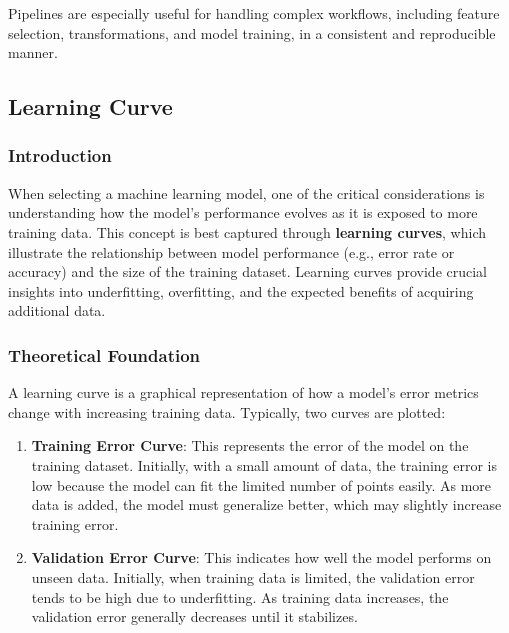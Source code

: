 \documentclass{article}
\begin{document}
Pipelines are especially useful for handling complex workflows,
including feature selection, transformations, and model training, in a
consistent and reproducible manner.

    \subsection{Learning Curve}\label{learning-curve}

    \subsubsection{Introduction}\label{introduction}

When selecting a machine learning model, one of the critical
considerations is understanding how the model's performance evolves as
it is exposed to more training data. This concept is best captured
through \textbf{learning curves}, which illustrate the relationship
between model performance (e.g., error rate or accuracy) and the size of
the training dataset. Learning curves provide crucial insights into
underfitting, overfitting, and the expected benefits of acquiring
additional data.

\subsubsection{Theoretical Foundation}\label{theoretical-foundation}

A learning curve is a graphical representation of how a model's error
metrics change with increasing training data. Typically, two curves are
plotted:

\begin{enumerate}
\def\labelenumi{\arabic{enumi}.}
\item
  \textbf{Training Error Curve}: This represents the error of the model
  on the training dataset. Initially, with a small amount of data, the
  training error is low because the model can fit the limited number of
  points easily. As more data is added, the model must generalize
  better, which may slightly increase training error.
\item
  \textbf{Validation Error Curve}: This indicates how well the model
  performs on unseen data. Initially, when training data is limited, the
  validation error tends to be high due to underfitting. As training
  data increases, the validation error generally decreases until it
  stabilizes.
\end{enumerate}
\end{document}
